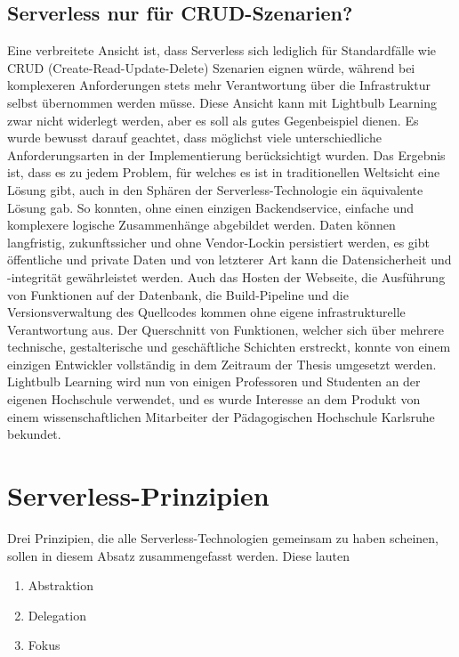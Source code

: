 \subsection{Serverless nur für CRUD-Szenarien?}
Eine verbreitete Ansicht ist, dass Serverless sich lediglich für Standardfälle wie CRUD (Create-Read-Update-Delete) Szenarien eignen würde, während bei komplexeren Anforderungen stets mehr Verantwortung über die Infrastruktur selbst übernommen werden müsse. Diese Ansicht kann mit Lightbulb Learning zwar nicht widerlegt werden, aber es soll als gutes Gegenbeispiel dienen. Es wurde bewusst darauf geachtet, dass möglichst viele unterschiedliche Anforderungsarten in der Implementierung berücksichtigt wurden. Das Ergebnis ist, dass es zu jedem Problem, für welches es ist in traditionellen Weltsicht eine Lösung gibt, auch in den Sphären der Serverless-Technologie ein äquivalente Lösung gab. So konnten, ohne einen einzigen Backendservice, einfache und komplexere logische Zusammenhänge abgebildet werden. Daten können langfristig, zukunftssicher und ohne Vendor-Lockin persistiert werden, es gibt öffentliche und private Daten und von letzterer Art kann die Datensicherheit und -integrität gewährleistet werden. Auch das Hosten der Webseite, die Ausführung von Funktionen auf der Datenbank, die Build-Pipeline und die Versionsverwaltung des Quellcodes kommen ohne eigene infrastrukturelle Verantwortung aus. Der Querschnitt von Funktionen, welcher sich über mehrere technische, gestalterische und geschäftliche Schichten erstreckt, konnte von einem einzigen Entwickler vollständig in dem Zeitraum der Thesis umgesetzt werden. Lightbulb Learning wird nun von einigen Professoren und Studenten an der eigenen Hochschule verwendet, und es wurde Interesse an dem Produkt von einem wissenschaftlichen Mitarbeiter der Pädagogischen Hochschule Karlsruhe bekundet.

\section{Serverless-Prinzipien}
Drei Prinzipien, die alle Serverless-Technologien gemeinsam zu haben scheinen, sollen in diesem Absatz zusammengefasst werden. Diese lauten

\begin{enumerate}
    \item Abstraktion
    \item Delegation
    \item Fokus
\end{enumerate}

